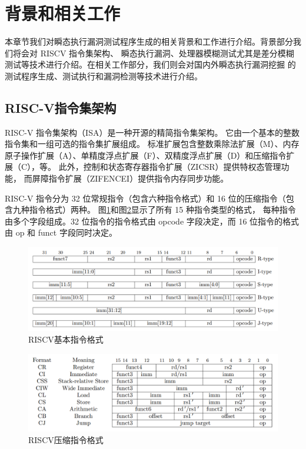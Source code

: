 \cleardoublepage

\section{背景和相关工作}

本章节我们对瞬态执行漏洞测试程序生成的相关背景和工作进行介绍。背景部分我们将会对 RISCV 指令集架构、
瞬态执行漏洞、处理器模糊测试尤其是差分模糊测试等技术进行介绍。在相关工作部分，我们则会对国内外瞬态执行漏洞挖掘
的测试程序生成、测试执行和漏洞检测等技术进行介绍。\par

\subsection{RISC-V指令集架构}

RISC-V 指令集架构（ISA）是一种开源的精简指令集架构\cite{riscv-isa-manual-all}。
它由一个基本的整数指令集和一组可选的指令集扩展组成。
标准扩展包含整数乘除法扩展（M）、内存原子操作扩展（A）、单精度浮点扩展（F）、双精度浮点扩展（D）和压缩指令扩展（C），等。
此外，控制和状态寄存器指令扩展（ZICSR）提供特权态管理功能， 而屏障指令扩展（ZIFENCEI）提供指令内存同步功能。\par

RISC-V 指令分为 32 位常规指令（包含六种指令格式）和 16 位的压缩指令（包含九种指令格式）两种。 
图\ref{review:base-inst}和图\ref{review:compress-inst}显示了所有 15 种指令类型的格式，
每种指令由多个字段组成。32 位指令的指令格式由 opcode 字段决定，而 16 位指令的格式由 op 和 funct 字段同时决定。\par

\begin{figure}[!h]
    \centering
    \includegraphics[width=\linewidth]{figure/proposal/riscv-base-instruct-format.png}
    \caption{RISCV基本指令格式}
    \label{review:base-inst}
\end{figure}
\begin{figure}[!h]
    \centering
    \includegraphics[width=\linewidth]{figure/proposal/riscv-compress-instruct-format.png}
    \caption{RISCV压缩指令格式}
    \label{review:compress-inst}
\end{figure}

